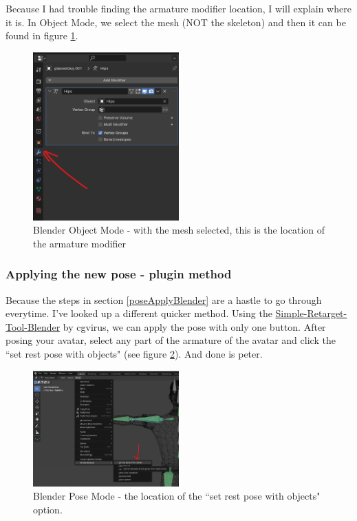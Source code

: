\documentclass{uva-inf-article}
\begin{document}
Because I had trouble finding the armature modifier location, I will explain where it is. In Object Mode, we select the mesh (NOT the skeleton) and then it can be found in figure \ref{fig:armMod}.
\begin{figure}[hbt!]
    \centering
    \includegraphics[width=0.5\textwidth]{imgs/Armature Modifier Location.png}
    \caption{Blender Object Mode - with the mesh selected, this is the location of the armature modifier}
    \label{fig:armMod}
\end{figure}

\subsubsection{Applying the new pose - plugin method}
Because the steps in section \ref{poseApplyBlender} are a hastle to go through everytime. I've looked up a different quicker method. Using the \href{https://github.com/cgvirus/Simple-Retarget-Tool-Blender}{Simple-Retarget-Tool-Blender} by cgvirus, we can apply the pose with only one button. After posing your avatar, select any part of the armature of the avatar and click the ``set rest pose with objects" (see figure \ref{fig:restPoseQuick}). And done is peter.

\begin{figure}[hbt!]
    \centering
    \includegraphics[width=0.5\textwidth]{imgs/restposeQuick.png}
    \caption{Blender Pose Mode - the location of the ``set rest pose with objects" option.}
    \label{fig:restPoseQuick}
\end{figure}
\end{document}
